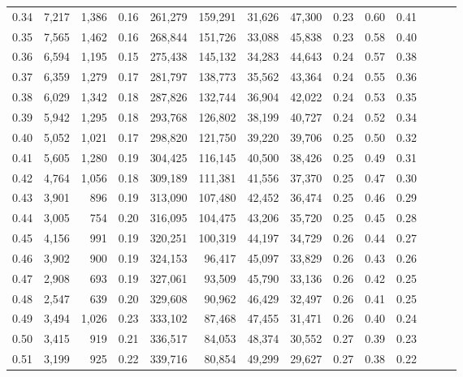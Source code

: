\begin{tabular}{rrrrrrrrrrrrrr}
0.34 &   7,217 &  1,386 &  0.16 &  261,279 &  159,291 &  31,626 &  47,300 &  0.23 &  0.60 &      0.41 \\
0.35 &   7,565 &  1,462 &  0.16 &  268,844 &  151,726 &  33,088 &  45,838 &  0.23 &  0.58 &      0.40 \\
0.36 &   6,594 &  1,195 &  0.15 &  275,438 &  145,132 &  34,283 &  44,643 &  0.24 &  0.57 &      0.38 \\
0.37 &   6,359 &  1,279 &  0.17 &  281,797 &  138,773 &  35,562 &  43,364 &  0.24 &  0.55 &      0.36 \\
0.38 &   6,029 &  1,342 &  0.18 &  287,826 &  132,744 &  36,904 &  42,022 &  0.24 &  0.53 &      0.35 \\
0.39 &   5,942 &  1,295 &  0.18 &  293,768 &  126,802 &  38,199 &  40,727 &  0.24 &  0.52 &      0.34 \\
0.40 &   5,052 &  1,021 &  0.17 &  298,820 &  121,750 &  39,220 &  39,706 &  0.25 &  0.50 &      0.32 \\
0.41 &   5,605 &  1,280 &  0.19 &  304,425 &  116,145 &  40,500 &  38,426 &  0.25 &  0.49 &      0.31 \\
0.42 &   4,764 &  1,056 &  0.18 &  309,189 &  111,381 &  41,556 &  37,370 &  0.25 &  0.47 &      0.30 \\
0.43 &   3,901 &    896 &  0.19 &  313,090 &  107,480 &  42,452 &  36,474 &  0.25 &  0.46 &      0.29 \\
0.44 &   3,005 &    754 &  0.20 &  316,095 &  104,475 &  43,206 &  35,720 &  0.25 &  0.45 &      0.28 \\
0.45 &   4,156 &    991 &  0.19 &  320,251 &  100,319 &  44,197 &  34,729 &  0.26 &  0.44 &      0.27 \\
0.46 &   3,902 &    900 &  0.19 &  324,153 &   96,417 &  45,097 &  33,829 &  0.26 &  0.43 &      0.26 \\
0.47 &   2,908 &    693 &  0.19 &  327,061 &   93,509 &  45,790 &  33,136 &  0.26 &  0.42 &      0.25 \\
0.48 &   2,547 &    639 &  0.20 &  329,608 &   90,962 &  46,429 &  32,497 &  0.26 &  0.41 &      0.25 \\
0.49 &   3,494 &  1,026 &  0.23 &  333,102 &   87,468 &  47,455 &  31,471 &  0.26 &  0.40 &      0.24 \\
0.50 &   3,415 &    919 &  0.21 &  336,517 &   84,053 &  48,374 &  30,552 &  0.27 &  0.39 &      0.23 \\
0.51 &   3,199 &    925 &  0.22 &  339,716 &   80,854 &  49,299 &  29,627 &  0.27 &  0.38 &      0.22 \\

\end{tabular}
